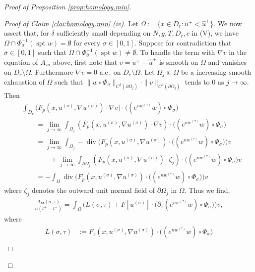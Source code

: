 \documentclass[11pt, letterpaper, reqno]{amsart}
\numberwithin{equation}{section}
\theoremstyle{remark}
\newcommand{\spt}{\operatorname{spt}}
\newcommand{\Div}{\operatorname{div}}
\begin{document}
\begin{proof}[Proof of Proposition \ref{prop:homology.min}]
\begin{proof}[Proof of Claim \ref{clai:homology.min} (iv)]
        Let $\Omega:= \{x\in D_r: u^+<\hat u^+\}$. We now assert that, for $\delta$ sufficiently small depending on $N, g, T, D_r, c$ in (V), we have $\Omega\cap \Phi_\sigma^{-1}(\spt w) = \emptyset$ for every $\sigma\in [0, 1]$.
		Suppose for contradiction that $\bar\sigma\in [0, 1]$ such that $\Omega \cap \Phi_{\bar\sigma}^{-1}(\spt w) \neq \emptyset$.       
        To handle the term with $\nabla v$ in the equation of $A_{\tau\sigma}$ above, first note that $v = u^+ - \hat u^+$ is smooth on $\Omega$ and vanishes on $D_r\setminus \Omega$. Furthermore $\nabla v = 0$ a.e.~on $D_r\setminus \Omega$. 
        Let $\Omega_j\Subset \Omega$ be a increasing smooth exhaustion of $\Omega$ such that $\|w\circ\Phi_\sigma\|_{C^1(\partial \Omega_j)}\cdot \|v\|_{C^0(\partial \Omega_j)}$ tends to $0$ as $j\to \infty$.
        Then
        \begin{align*}
            & \int_{D_r} \Big(F_p(x, u^{(\sigma)}, \nabla u^{(\sigma)})\cdot \nabla v\Big)\cdot \big( (e^{n w^{(\tau)}}w)\circ\Phi_\sigma \big) \\
            & \qquad = \lim_{j\to \infty} \int_{\Omega_j} (F_p(x, u^{(\sigma)}, \nabla u^{(\sigma)})\cdot \nabla v)\cdot \big( (e^{n w^{(\tau)}}w)\circ\Phi_\sigma \big) \\
            & \qquad = \lim_{j\to \infty} \int_{\Omega_j} -\Div \Big( F_p(x, u^{(\sigma)}, \nabla u^{(\sigma)})\cdot \big( (e^{n w^{(\tau)}}w)\circ\Phi_\sigma \big) \Big) v \\
            & \qquad \qquad + \lim_{j\to \infty} \int_{\partial\Omega_j} \left(F_p(x, u^{(\sigma)}, \nabla u^{(\sigma)})\cdot \zeta_j\right)\cdot \big( (e^{n w^{(\tau)}}w)\circ\Phi_\sigma \big) v \\
            & \qquad = - \int_{\Omega} \Div \Big( F_p(x, u^{(\sigma)}, \nabla u^{(\sigma)})\cdot \big( (e^{n w^{(\tau)}}w)\circ\Phi_\sigma \big) \Big) v
        \end{align*}
        where $\zeta_j$ denotes the outward unit normal field of $\partial\Omega_j$ in $\Omega$. Thus we find, 
        \begin{align}
            \frac{A_{\tau \sigma}(\sigma, \tau)}{n(t^+-t^-)} = \int_{\Omega} \Big( L(\sigma, \tau) + 
            F[u^{(\sigma)}]\cdot \big(\partial_z(e^{n w^{(\tau)}}w)\circ\Phi_\sigma \big) \Big)v, \label{eq:A_(tau sigma)expression}            
        \end{align}
        where 
        \begin{align*}
            L(\sigma, \tau) 
            	& := F_z(x, u^{(\sigma)}, \nabla u^{(\sigma)})\cdot \big( (e^{n w^{(\tau)}}w)\circ\Phi_\sigma\big) \\

\end{align*}
\end{proof}
\end{proof}
\end{document}
